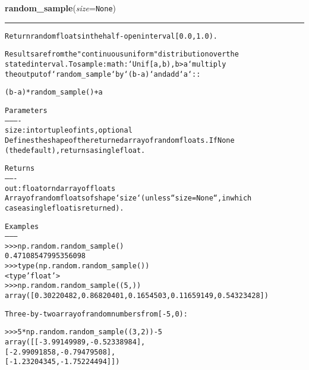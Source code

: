 \hspace{.8\funcindent}\begin{boxedminipage}{\funcwidth}

    \raggedright \textbf{random\_sample}(\textit{size}={\tt None})

    \vspace{-1.5ex}

    \rule{\textwidth}{0.5\fboxrule}
\setlength{\parskip}{2ex}
\begin{alltt}
Return random floats in the half-open interval [0.0, 1.0).

Results are from the "continuous uniform" distribution over the
stated interval.  To sample :math:`Unif[a, b), b {\textgreater} a` multiply
the output of `random\_sample` by `(b-a)` and add `a`::

  (b - a) * random\_sample() + a

Parameters
----------
size : int or tuple of ints, optional
    Defines the shape of the returned array of random floats. If None
    (the default), returns a single float.

Returns
-------
out : float or ndarray of floats
    Array of random floats of shape `size` (unless ``size=None``, in which
    case a single float is returned).

Examples
--------
{\textgreater}{\textgreater}{\textgreater} np.random.random\_sample()
0.47108547995356098
{\textgreater}{\textgreater}{\textgreater} type(np.random.random\_sample())
{\textless}type 'float'{\textgreater}
{\textgreater}{\textgreater}{\textgreater} np.random.random\_sample((5,))
array([ 0.30220482,  0.86820401,  0.1654503 ,  0.11659149,  0.54323428])

Three-by-two array of random numbers from [-5, 0):

{\textgreater}{\textgreater}{\textgreater} 5 * np.random.random\_sample((3, 2)) - 5
array([[-3.99149989, -0.52338984],
       [-2.99091858, -0.79479508],
       [-1.23204345, -1.75224494]])
\end{alltt}

\setlength{\parskip}{1ex}
    \end{boxedminipage}

    \label{trunk:qstkutil:bollinger:rayleigh}

    \vspace{0.5ex}

